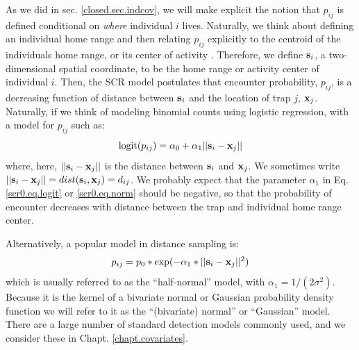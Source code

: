 As we did in sec. \ref{closed.sec.indcov}, we will make explicit the
notion that $p_{ij}$ is defined conditional on {\it where} individual
$i$ lives. Naturally, we think about defining an individual home range
and then relating $p_{ij}$ explicitly to the centroid of the
individuals home range, or its center of activity \citep{efford:2004,
  borchers_efford:2008, royle_young:2008}.  Therefore, we define ${\bf
  s}_{i}$, a two-dimensional spatial coordinate, to be the home range
or activity
center of individual $i$. Then, the SCR model postulates that
encounter probability, $p_{ij}$, is a decreasing function of distance
between ${\bf s}_{i}$ and the location of trap $j$, ${\bf x}_{j}$.
Naturally, if we think of modeling binomial counts using logistic
regression, with a model for $p_{ij}$ such as:
\begin{equation}
	\mbox{logit}(p_{ij}) = \alpha_{0} + \alpha_1 ||{\bf s}_{i}-{\bf x}_{j} ||
\label{scr0.eq.logit}
\end{equation}
where, here, $||{\bf s}_{i}-{\bf x}_{j}||$ is the distance between
${\bf s}_{i}$ and ${\bf x}_{j}$. We sometimes write $||{\bf
  s}_{i}-{\bf x}_{j}|| = dist({\bf s}_{i},{\bf x}_{j}) =
d_{ij}$.
We probably expect that the parameter $\alpha_{1}$ in
Eq. \ref{scr0.eq.logit} or \ref{scr0.eq.norm} should be negative, so
that the probability of encounter decreases with distance between the
trap and individual home range center.  

Alternatively, a popular model in distance sampling is:
\begin{equation}
p_{ij} = p_{0}*\exp(-\alpha_{1} *||{\bf s}_{i}-{\bf x}_{j}||^2)
\label{scr0.eq.norm}
\end{equation}
which is usually referred to as the ``half-normal'' model,
with $\alpha_{1} = 1/(2\sigma^{2})$.  Because it
is the kernel of a bivariate normal or Gaussian probability density
function we will refer to it as the ``(bivariate) normal'' or
``Gaussian'' model.  There are a large number of standard detection
models commonly used, and we consider these in
Chapt. \ref{chapt.covariates}. 

